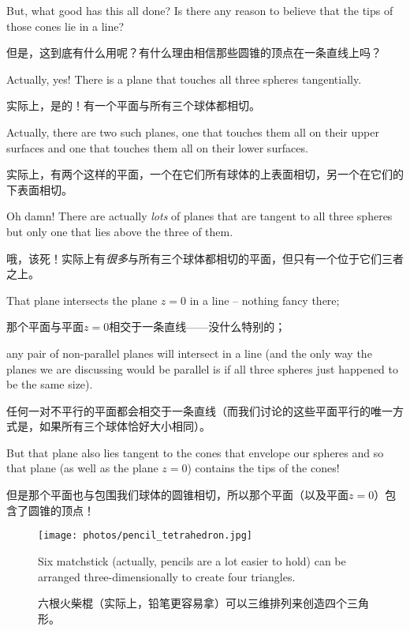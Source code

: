 But, what good has this all done?
Is there any reason to believe that the tips of those cones lie in a line?

但是，这到底有什么用呢？有什么理由相信那些圆锥的顶点在一条直线上吗？

Actually, yes!  There is a plane that touches all three spheres tangentially.

实际上，是的！有一个平面与所有三个球体都相切。

Actually, there are two such planes, one that touches them all on their
upper surfaces and one that touches them all on their lower surfaces.

实际上，有两个这样的平面，一个在它们所有球体的上表面相切，另一个在它们的下表面相切。

Oh 
damn!  There are actually \emph{lots} of planes that are tangent to all three spheres
but only one that lies above the three of them.

哦，该死！实际上有\emph{很多}与所有三个球体都相切的平面，但只有一个位于它们三者之上。

That plane intersects the
plane $z=0$ in a line -- nothing fancy there;

那个平面与平面$z=0$相交于一条直线——没什么特别的；

any pair of non-parallel planes
will intersect in a line (and the only way the planes we are discussing
would be parallel is if all three spheres just happened to be the same size).

任何一对不平行的平面都会相交于一条直线（而我们讨论的这些平面平行的唯一方式是，如果所有三个球体恰好大小相同）。

But that plane also lies tangent to the cones that envelope our spheres
and so that plane (as well as the plane $z=0$) contains the tips of the
cones!

但是那个平面也与包围我们球体的圆锥相切，所以那个平面（以及平面$z=0$）包含了圆锥的顶点！

\clearpage

\rule{0pt}{0pt}

\vfill

\begin{figure}[!hbtp] 
\begin{center}
\texttt{[image: photos/pencil\_tetrahedron.jpg]}
\end{center}
\caption[Four triangles bounded by 6 line segments]{Six matchstick (actually, pencils are a lot easier to hold) can be arranged three-dimensionally to create
four triangles.}
\caption[由6条线段围成的四个三角形]{六根火柴棍（实际上，铅笔更容易拿）可以三维排列来创造四个三角形。}
\label{fig:4triangles}
\end{figure}
 
\vfill

\rule{0pt}{0pt}

\clearpage





